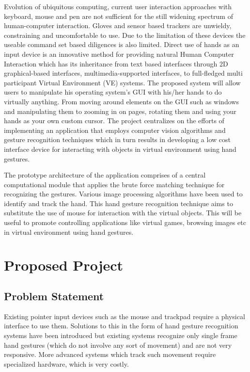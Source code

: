 \documentclass[11pt]{report}
\begin{document}
Evolution of ubiquitous computing, current user interaction approaches with keyboard, mouse and pen are not sufficient for the still widening spectrum of human-computer interaction. Gloves and sensor based trackers are unwieldy, constraining and uncomfortable to use. Due to the limitation of these devices the useable command set based diligences is also limited. Direct use of hands as an input device is an innovative method for providing natural Human Computer Interaction which has its inheritance from text based interfaces through 2D graphical-based interfaces, multimedia-supported interfaces, to full-fledged multi participant Virtual Environment (VE) systems. The proposed system will allow users to manipulate his operating system’s GUI with his/her hands to do virtually anything. From moving around elements on the GUI such as windows and manipulating them to zooming in on pages, rotating them and using your hands as your own custom cursor. The project centralizes on the efforts of implementing an application that employs computer vision algorithms and gesture recognition techniques which in turn results in developing a low cost interface device for interacting with objects in virtual environment using hand gestures.

The prototype architecture of the application comprises of a central computational module that applies the brute force matching technique for recognizing the gestures. Various image processing algorithms have been used to identify and track the hand. This hand gesture recognition technique aims to substitute the use of mouse for interaction with the virtual objects. This will be useful to promote controlling applications like virtual games, browsing images etc in virtual environment using hand gestures.

\section{Proposed Project}

\subsection{Problem Statement}

Existing pointer input devices such as the mouse and trackpad require a physical interface to use them. Solutions to this in the form of hand gesture recognition systems have been introduced but existing systems recognize only single frame hand gestures (which do not involve any sort of movement) and are not very responsive. More advanced systems which track such movement require specialized hardware, which is very costly.
\end{document}
